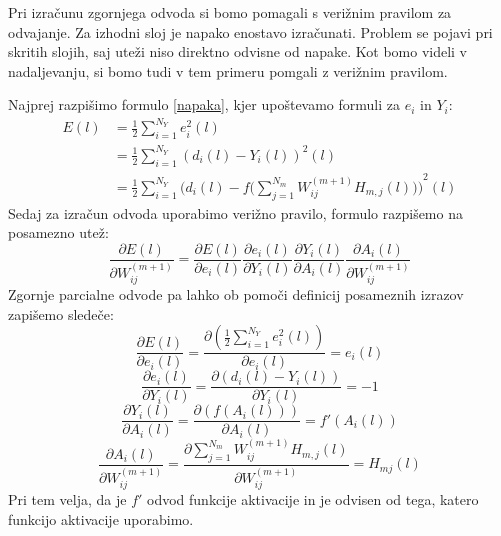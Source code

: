 \documentclass[mat1]{fmfdelo}
\begin{document}
Pri izračunu zgornjega odvoda si bomo pomagali s verižnim pravilom za odvajanje. Za izhodni sloj je napako enostavo izračunati. Problem se pojavi pri skritih slojih, saj uteži niso direktno odvisne od napake. Kot bomo videli v nadaljevanju, si bomo tudi v tem primeru pomgali z verižnim pravilom. 

Najprej razpišimo formulo \eqref{napaka}, kjer upoštevamo formuli za $e_i$ in $Y_i$:
\begin{equation*}
\begin{aligned}
E(l) &= \frac{1}{2}\sum^{N_Y}_{i=1}e_i^2(l) \\
&=\frac{1}{2}\sum^{N_Y}_{i=1}{(d_i(l) - Y_i(l))}^2(l) \\
&= \frac{1}{2}\sum^{N_Y}_{i=1}{(d_i(l)-f(\sum^{N_m}_{j=1}{W^{(m+1)}_{ij}H_{m,j}(l)))}}^2(l)  
\end{aligned}
\end{equation*}
%
 Sedaj za izračun odvoda uporabimo verižno pravilo,  formulo razpišemo na posamezno utež:
%
\begin{equation}
\frac{\partial E(l)}{\partial W^{(m+1)}_{ij}} = \frac{\partial E(l)}{\partial e_i(l)}
\frac{\partial e_i(l)}{\partial Y_i(l)} 
\frac{\partial Y_i(l)}{\partial A_i(l)}
\frac{\partial A_i(l)}{\partial W^{(m+1)}_{ij}}
\end{equation}
%
Zgornje parcialne odvode pa lahko ob pomoči definicij posameznih izrazov zapišemo sledeče:
%
\begin{equation}
\frac{\partial E(l)}{\partial e_i(l)} = \frac{\partial (\frac{1}{2}\sum^{N_Y}_{i=1}e_i^2(l))}{\partial e_i(l)}=e_i(l)
\end{equation}
%
\begin{equation}
\frac{\partial e_i(l)}{\partial Y_i(l)}= \frac{\partial (d_i(l) - Y_i(l))}{\partial Y_i(l)} = -1
\end{equation}
%
\begin{equation}
\frac{\partial Y_i(l)}{\partial A_i(l)} = \frac{\partial (f(A_i(l))) }{\partial A_i(l)} =f'(A_i(l))
\end{equation}
%
\begin{equation}
\frac{\partial A_i(l)}{\partial W^{(m+1)}_{ij}} =\frac{\partial \sum^{N_m}_{j=1}W_{ij}^{(m+1)}H_{m,j}(l)}{\partial W^{(m+1)}_{ij}} = H_{mj}(l)
\end{equation}
%
Pri tem velja, da je $f'$ odvod funkcije aktivacije in je odvisen od tega, katero funkcijo aktivacije uporabimo. 
\end{document}
